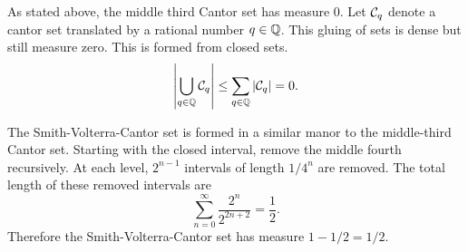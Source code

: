 \begin{example}
As stated above, the middle third Cantor set has measure $0$.  Let $\mathcal{C}_q$ denote a cantor set translated by a rational number $q \in \mathbb{Q}$.  This gluing of sets is dense but still measure zero.  This is formed from closed sets. 
$$\left\vert \bigcup_{q \in \mathbb{Q}} \mathcal{C}_q \right\vert \leq  \sum_{q \in \mathbb{Q}}\left\vert\mathcal{C}_q\right\vert = 0.$$
\end{example}

\begin{example}
    The Smith-Volterra-Cantor set is formed in a similar manor to the middle-third Cantor set.  Starting with the closed interval, remove the middle fourth recursively.  At each level, $2^{n-1}$ intervals of length $1/4^n$ are removed.  The total length of these removed intervals are $$\sum_{n=0}^\infty \frac{2^n}{2^{2n+2}} = \frac{1}{2}.$$
    Therefore the Smith-Volterra-Cantor set has measure $1 - 1/2 = 1/2.$
    \end{example}
    
    
    
    